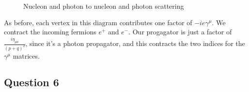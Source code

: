 \begin{figure}[htpb]
\centering

\caption{Nucleon and photon 
to nucleon and photon scattering}%
\label{fig:e4_q1}
\end{figure}

As before, each vertex in this diagram 
contributes one factor of $  -i e \gamma ^ \mu $. 
We contract the incoming fermions  $ e ^ + $ and $ e ^ - $. 
Our progagator is just a factor of $ \frac{i \eta_{ \mu \nu } }{ \left( p + q  \right)  ^ 2 }$, 
since it's a photon propagator, and this contracts the two 
indices for the $ \gamma ^ \mu $ matrices.  


\subsection*{Question 6}

